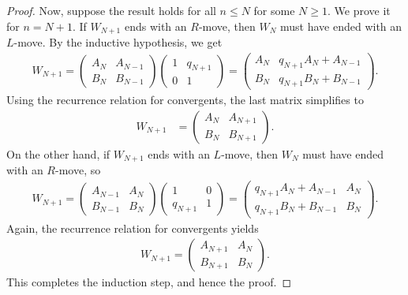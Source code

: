 \documentclass[12pt]{article}
\theoremstyle{plain}
\theoremstyle{definition}
\theoremstyle{remark}
\begin{document}
\begin{proof}
Now, suppose the result holds for all $ n \leq N $ for some $ N \geq 1 $. We prove it for $ n = N + 1 $. If $ W_{N + 1} $ ends with an $ R $-move, then $ W_N $ must have ended with an $ L $-move. By the inductive hypothesis, we get
\begin{align*}
	W_{N + 1} = \begin{pmatrix} A_N & A_{N - 1} \\ B_N & B_{N - 1} \end{pmatrix} \begin{pmatrix} 1 & q_{N + 1} \\ 0 & 1 \end{pmatrix} = \begin{pmatrix} A_N & q_{N + 1} A_N + A_{N - 1} \\ B_N & q_{N + 1} B_N + B_{N - 1} \end{pmatrix}.
\end{align*}
Using the recurrence relation for convergents, the last matrix simplifies to
\begin{align*}
	W_{N + 1} &= \begin{pmatrix} A_N & A_{N + 1} \\ B_N & B_{N + 1} \end{pmatrix}.
\end{align*}
On the other hand, if $ W_{N + 1} $ ends with an $ L $-move, then $ W_N $ must have ended with an $ R $-move, so 
\begin{align*}
	W_{N + 1} = \begin{pmatrix} A_{N - 1} & A_N \\ B_{N - 1} & B_N \end{pmatrix} \begin{pmatrix} 1 & 0 \\ q_{N + 1} & 1 \end{pmatrix} = \begin{pmatrix} q_{N + 1} A_N + A_{N - 1} & A_N \\ q_{N + 1} B_N + B_{N - 1} & B_N \end{pmatrix}.
\end{align*}
Again, the recurrence relation for convergents yields
\begin{align*}
	W_{N + 1} = \begin{pmatrix} A_{N + 1} & A_N \\ B_{N + 1} & B_N \end{pmatrix}.
\end{align*}
This completes the induction step, and hence the proof. 
\end{proof}
\end{document}
